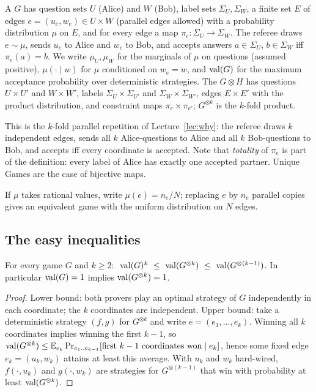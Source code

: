 \begin{definition}\label{def:wgame}
A  $G$ has question sets $U$ (Alice) and $W$ (Bob), label sets $\Sigma_U,\Sigma_W$, a finite set $E$ of edges $e=(u_e,w_e)\in U\times W$ (parallel edges allowed) with a probability distribution $\mu$ on $E$, and for every edge a map $\pi_e\colon\Sigma_U\to\Sigma_W$.
The referee draws $e\sim\mu$, sends $u_e$ to Alice and $w_e$ to Bob, and accepts answers $a\in\Sigma_U$, $b\in\Sigma_W$ iff $\pi_e(a)=b$.
We write $\mu_U,\mu_W$ for the marginals of $\mu$ on questions (assumed positive), $\mu(\cdot\mid w)$ for $\mu$ conditioned on $w_e=w$, and $\operatorname{val}(G)$ for the maximum acceptance probability over deterministic strategies.
The  $G\otimes H$ has questions $U\times U'$ and $W\times W'$, labels $\Sigma_U\times\Sigma_{U'}$ and $\Sigma_W\times\Sigma_{W'}$, edges $E\times E'$ with the product distribution, and constraint maps $\pi_e\times\pi_{e'}$; $G^{\otimes k}$ is the $k$-fold product.
\end{definition}

\noindent
This is the $k$-fold parallel repetition of Lecture~\ref{lec:why}: the referee draws $k$ independent edges, sends all $k$ Alice-questions to Alice and all $k$ Bob-questions to Bob, and accepts iff every coordinate is accepted.
Note that \emph{totality} of $\pi_e$ is part of the definition: every label of Alice has exactly one accepted partner.  Unique Games are the case of bijective maps.

\begin{remark}\label{rem:multiplicity}
If $\mu$ takes rational values, write $\mu(e)=n_e/N$; replacing $e$ by $n_e$ parallel copies gives an equivalent game with the uniform distribution on $N$ edges.
\end{remark}

\subsection{The easy inequalities}

\begin{lemma}\label{lem:rep-basic}
For every game $G$ and $k\ge2$: $\ \val(G)^k\ \le\ \val(G^{\otimes k})\ \le\ \val(G^{\otimes(k-1)})$.  In particular $\operatorname{val}(G)=1$ implies $\operatorname{val}(G^{\otimes k})=1$.
\end{lemma}
\begin{proof}
Lower bound: both provers play an optimal strategy of $G$ independently in each coordinate; the $k$ coordinates are independent.
Upper bound: take a deterministic strategy $(f,g)$ for $G^{\otimes k}$ and write $e=(e_1,\dots,e_k)$.  Winning all $k$ coordinates implies winning the first $k-1$, so
$\operatorname{val}(G^{\otimes k})\le\operatorname*{\mathbb{E}}_{e_k}\Pr_{e_1..e_{k-1}}[\text{first }k-1\text{ coordinates won}\mid e_k]$, hence some fixed edge $e_k=(u_k,w_k)$ attains at least this average.  With $u_k$ and $w_k$ hard-wired, $f(\cdot,u_k)$ and $g(\cdot,w_k)$ are strategies for $G^{\otimes(k-1)}$ that win with probability at least $\operatorname{val}(G^{\otimes k})$.
\end{proof}

